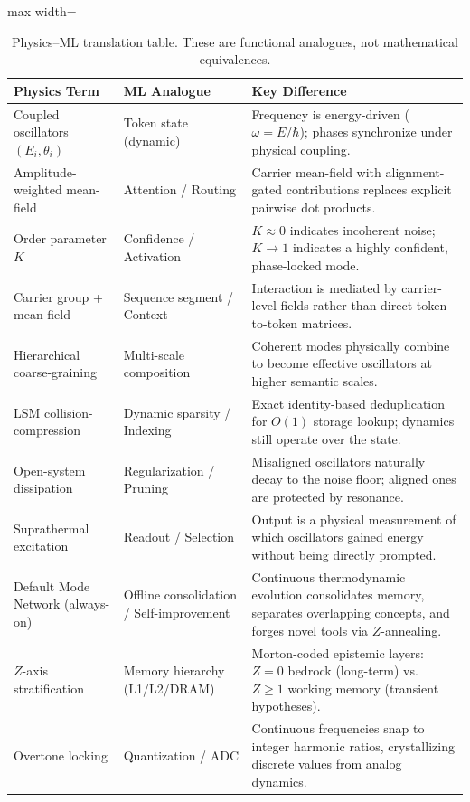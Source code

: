 \documentclass[11pt,a4paper]{article}
\begin{document}
\begin{table}[!htbp]
\centering
\caption{Physics–ML translation table. These are functional analogues, not mathematical equivalences.}
\label{tab:rosetta}
\renewcommand{\arraystretch}{1.3}
\begin{adjustbox}{max width=\textwidth}
\begin{tabular}{l l p{6.5cm}}
\toprule
\textbf{Physics Term} & \textbf{ML Analogue} & \textbf{Key Difference} \\
\midrule
Coupled oscillators $(E_i,\theta_i)$ & Token state (dynamic) & Frequency is energy-driven ($\omega=E/\hbar$); phases synchronize under physical coupling. \\
Amplitude-weighted mean-field & Attention / Routing & Carrier mean-field with alignment-gated contributions replaces explicit pairwise dot products. \\
Order parameter $K$ & Confidence / Activation & $K\approx 0$ indicates incoherent noise; $K\to 1$ indicates a highly confident, phase-locked mode. \\
Carrier group + mean-field & Sequence segment / Context & Interaction is mediated by carrier-level fields rather than direct token-to-token matrices. \\
Hierarchical coarse-graining & Multi-scale composition & Coherent modes physically combine to become effective oscillators at higher semantic scales. \\
LSM collision-compression & Dynamic sparsity / Indexing & Exact identity-based deduplication for $O(1)$ storage lookup; dynamics still operate over the state. \\
Open-system dissipation & Regularization / Pruning & Misaligned oscillators naturally decay to the noise floor; aligned ones are protected by resonance. \\
Suprathermal excitation & Readout / Selection & Output is a physical measurement of which oscillators gained energy without being directly prompted. \\
Default Mode Network (always-on) & Offline consolidation / Self-improvement & Continuous thermodynamic evolution consolidates memory, separates overlapping concepts, and forges novel tools via $Z$-annealing. \\
$Z$-axis stratification & Memory hierarchy (L1/L2/DRAM) & Morton-coded epistemic layers: $Z\!=\!0$ bedrock (long-term) vs.\ $Z \ge 1$ working memory (transient hypotheses). \\
Overtone locking & Quantization / ADC & Continuous frequencies snap to integer harmonic ratios, crystallizing discrete values from analog dynamics. \\
\bottomrule
\end{tabular}
\end{adjustbox}
\end{table}
\end{document}
